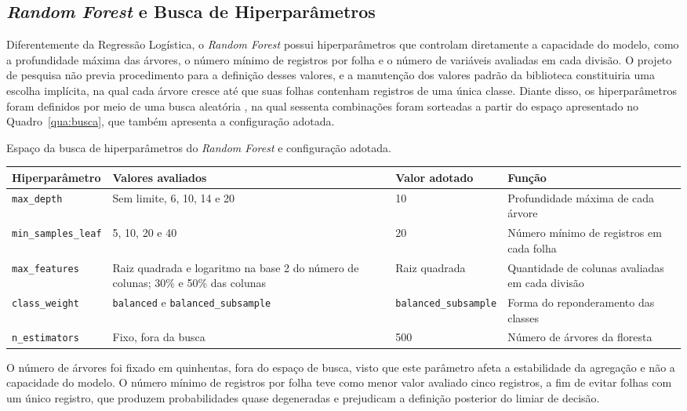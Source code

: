 \subsection{\textit{Random Forest} e Busca de Hiperparâmetros}\label{sec:random-forest}
Diferentemente da Regressão Logística, o \textit{Random Forest} possui hiperparâmetros que controlam diretamente a capacidade do modelo, como a profundidade máxima das árvores, o número mínimo de registros por folha e o número de variáveis avaliadas em cada divisão. O projeto de pesquisa não previa procedimento para a definição desses valores, e a manutenção dos valores padrão da biblioteca constituiria uma escolha implícita, na qual cada árvore cresce até que suas folhas contenham registros de uma única classe. Diante disso, os hiperparâmetros foram definidos por meio de uma busca aleatória \cite{pedregosa2011scikit}, na qual sessenta combinações foram sorteadas a partir do espaço apresentado no Quadro~\ref{qua:busca}, que também apresenta a configuração adotada.

\begin{quadro}[htb]
  \caption{\label{qua:busca}Espaço da busca de hiperparâmetros do \textit{Random Forest} e configuração adotada.}
  \small
  \begin{tabular}{|p{3.4cm}|p{4.3cm}|p{3.6cm}|p{2.9cm}|}
    \hline
    \textbf{Hiperparâmetro} & \textbf{Valores avaliados} & \textbf{Valor adotado} & \textbf{Função} \\ \hline
    \texttt{max\_depth} & Sem limite, 6, 10, 14 e 20 & 10 & Profundidade máxima de cada árvore \\ \hline
    \texttt{min\_samples\_leaf} & 5, 10, 20 e 40 & 20 & Número mínimo de registros em cada folha \\ \hline
    \texttt{max\_features} & Raiz quadrada e logaritmo na base 2 do número de colunas; 30\% e 50\% das colunas & Raiz quadrada & Quantidade de colunas avaliadas em cada divisão \\ \hline
    \texttt{class\_weight} & \texttt{balanced} e \texttt{balanced\_subsample} & \texttt{balanced\_subsample} & Forma do reponderamento das classes \\ \hline
    \texttt{n\_estimators} & Fixo, fora da busca & 500 & Número de árvores da floresta \\ \hline
  \end{tabular}
\end{quadro}

O número de árvores foi fixado em quinhentas, fora do espaço de busca, visto que este parâmetro afeta a estabilidade da agregação e não a capacidade do modelo. O número mínimo de registros por folha teve como menor valor avaliado cinco registros, a fim de evitar folhas com um único registro, que produzem probabilidades quase degeneradas e prejudicam a definição posterior do limiar de decisão.

